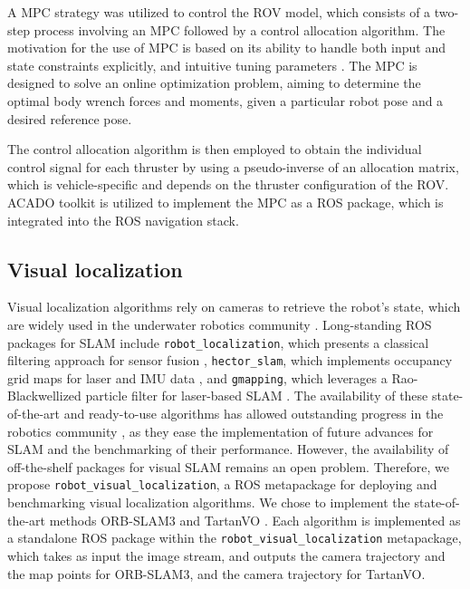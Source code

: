 A \ac{MPC} strategy was utilized to control the \ac{ROV} model, which consists of a two-step process involving an \ac{MPC} followed by a control allocation algorithm. The motivation for the use of MPC is based on its ability to handle both input and state constraints explicitly, and intuitive tuning parameters \cite{mpc_survey}.   
The \ac{MPC} is designed to solve an online optimization problem, aiming to determine the optimal body wrench forces and moments, given a particular robot pose and a desired reference pose. 

The control allocation algorithm is then employed to obtain the individual control signal for each thruster by using a pseudo-inverse of an allocation matrix, which is vehicle-specific and depends on the thruster configuration of the \ac{ROV}. ACADO toolkit \cite{acado} is utilized to implement the \ac{MPC} as a  \ac{ROS} package, which is integrated into the  \ac{ROS} navigation stack.

\subsection{Visual localization}
Visual localization algorithms rely on cameras to retrieve the robot's state, which are widely used in the underwater robotics community \cite{olaya_survey}. %
Long-standing ROS packages for SLAM include \texttt{robot\_localization}, which presents a classical filtering approach for sensor fusion \cite{vSLAM:moore2016robot_localizationROS}, \texttt{hector\_slam}, which implements occupancy grid maps for laser and IMU data \cite{vSLAM:hectorSLAM}, and \texttt{gmapping}, which leverages a Rao-Blackwellized particle filter for laser-based SLAM  \cite{vSLAM:gmapping}.
The availability of these state-of-the-art and ready-to-use algorithms has allowed outstanding progress in the robotics community \cite{vSLAM:lidarreview,vSLAM:hectorreview1,vSLAM:hectorreview2,vSLAM:gmappingreview1,vSLAM:gmappingreview2}, as they ease the implementation of future advances for SLAM and the benchmarking of their performance. However, the availability of off-the-shelf packages for visual SLAM remains an open problem.
Therefore, we propose \texttt{robot\_visual\_localization}, a ROS metapackage for deploying and benchmarking visual localization algorithms. We chose to implement the state-of-the-art methods ORB-SLAM3 \cite{campos2021orb} and TartanVO \cite{wang2020tartanvo}. Each algorithm is implemented as a standalone ROS package within the \texttt{robot\_visual\_localization} metapackage, which takes as input the image stream, and outputs the camera trajectory and the map points for ORB-SLAM3, and the camera trajectory for TartanVO. 

